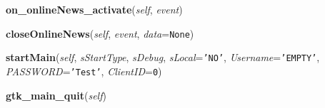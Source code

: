 \hspace{.8\funcindent}\begin{boxedminipage}{\funcwidth}

    \raggedright \textbf{on\_onlineNews\_activate}(\textit{self}, \textit{event})

\setlength{\parskip}{2ex}
\setlength{\parskip}{1ex}
    \end{boxedminipage}

    \label{Cuon:MainWindow:closeOnlineNews}

    \vspace{0.5ex}

\hspace{.8\funcindent}\begin{boxedminipage}{\funcwidth}

    \raggedright \textbf{closeOnlineNews}(\textit{self}, \textit{event}, \textit{data}={\tt None})

\setlength{\parskip}{2ex}
\setlength{\parskip}{1ex}
    \end{boxedminipage}

    \label{Cuon:MainWindow:startMain}

    \vspace{0.5ex}

\hspace{.8\funcindent}\begin{boxedminipage}{\funcwidth}

    \raggedright \textbf{startMain}(\textit{self}, \textit{sStartType}, \textit{sDebug}, \textit{sLocal}={\tt 'NO'}, \textit{Username}={\tt 'EMPTY'}, \textit{PASSWORD}={\tt 'Test'}, \textit{ClientID}={\tt 0})

\setlength{\parskip}{2ex}
\setlength{\parskip}{1ex}
    \end{boxedminipage}

    \label{Cuon:MainWindow:gtk_main_quit}

    \vspace{0.5ex}

\hspace{.8\funcindent}\begin{boxedminipage}{\funcwidth}

    \raggedright \textbf{gtk\_main\_quit}(\textit{self})

\setlength{\parskip}{2ex}
\setlength{\parskip}{1ex}
    \end{boxedminipage}


